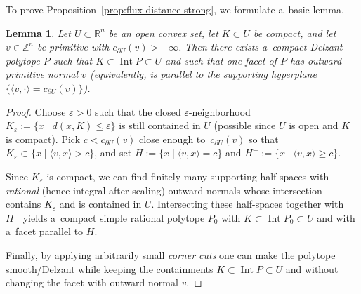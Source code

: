 \documentclass[pdftex]{sigma}
\numberwithin{equation}{section}
\newcommand{\bR}{{\mathbb R}}
\newcommand{\bZ}{{\mathbb Z}}
\newtheorem{lm}[Theorem]{Lemma}
\theoremstyle{definition}
\begin{document}
To prove Proposition~\ref{prop:flux-distance-strong}, we formulate a~basic lemma.
 \begin{lm}\label{lemma2.11}
 Let $U\subset\bR^n$ be an open convex set, let ${K\subset U}$ be compact, and let ${v\in\bZ^n}$ be primitive with $c_{\partial U}(v)>-\infty$.
 Then there exists a~compact Delzant polytope $P$ such that $K\subset \operatorname{Int} P\subset U$ and such that one facet of $P$ has outward primitive normal $v$ {\rm(}equivalently, is parallel to the supporting hyperplane $\{\langle v,\cdot\rangle=c_{\partial U}(v)\}${\rm)}.
 \end{lm}
\begin{proof}
Choose $\varepsilon>0$ such that the closed $\varepsilon$-neighborhood $K_\varepsilon:=\{x\mid d(x,K)\le \varepsilon\}$ is still contained in $U$ (possible since $U$ is open and $K$ is compact).
Pick $c<c_{\partial U}(v)$ close enough to~$c_{\partial U}(v)$ so that $K_\varepsilon\subset\{x\mid \langle v,x\rangle>c\}$, and set $H:=\{x\mid \langle v,x\rangle=c\}$ and $H^-:=\{x\mid \langle v,x\rangle\ge c\}$.

Since $K_\varepsilon$ is compact, we can find finitely many supporting half-spaces with \emph{rational} (hence integral after scaling) outward normals whose intersection contains $K_\varepsilon$ and is contained in $U$. Intersecting these half-spaces together with $H^{-}$ yields a~compact simple rational polytope $P_0$ with $K\subset \operatorname{Int} P_0\subset U$ and with a~facet parallel to $H$.

Finally, by applying arbitrarily small \emph{corner cuts} one can make the polytope smooth/Delzant while keeping the containments $K\subset \operatorname{Int} P\subset U$ and without changing the facet with outward normal $v$.
\end{proof}
\end{document}
